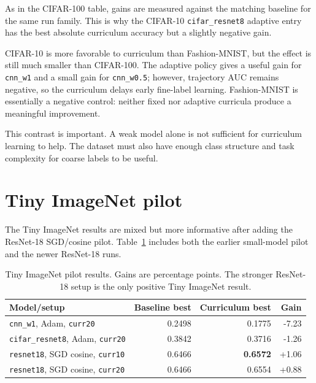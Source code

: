 As in the CIFAR-100 table, gains are measured against the matching baseline for
the same run family. This is why the CIFAR-10 \texttt{cifar\_resnet8} adaptive
entry has the best absolute curriculum accuracy but a slightly negative gain.

CIFAR-10 is more favorable to curriculum than Fashion-MNIST, but the effect is
still much smaller than CIFAR-100. The adaptive policy gives a useful gain for
\texttt{cnn\_w1} and a small gain for \texttt{cnn\_w0.5}; however, trajectory
AUC remains negative, so the curriculum delays early fine-label learning.
Fashion-MNIST is essentially a negative control: neither fixed nor adaptive
curricula produce a meaningful improvement.

This contrast is important. A weak model alone is not sufficient for curriculum
learning to help. The dataset must also have enough class structure and task
complexity for coarse labels to be useful.

\section{Tiny ImageNet pilot}

The Tiny ImageNet \cite{tinyimagenet,deng2009imagenet} results are mixed but
more informative after adding the ResNet-18 \cite{he2016deep} SGD/cosine
\cite{loshchilov2017sgdr} pilot. Table~\ref{tab:appg-tinyimagenet-policy}
includes both the earlier small-model pilot and the newer ResNet-18 runs.

\begin{table}[h]
\centering
\small
\begin{tabular}{lrrr}
\hline
Model/setup & Baseline best & Curriculum best & Gain \\
\hline
\texttt{cnn\_w1}, Adam, \texttt{curr20} & 0.2498 & 0.1775 & -7.23 \\
\texttt{cifar\_resnet8}, Adam, \texttt{curr20} & 0.3842 & 0.3716 & -1.26 \\
\texttt{resnet18}, SGD cosine, \texttt{curr10} & 0.6466 & \textbf{0.6572} & +1.06 \\
\texttt{resnet18}, SGD cosine, \texttt{curr20} & 0.6466 & 0.6554 & +0.88 \\
\hline
\end{tabular}
\caption{Tiny ImageNet pilot results. Gains are percentage points. The stronger
ResNet-18 setup is the only positive Tiny ImageNet result.}
\label{tab:appg-tinyimagenet-policy}
\end{table}

